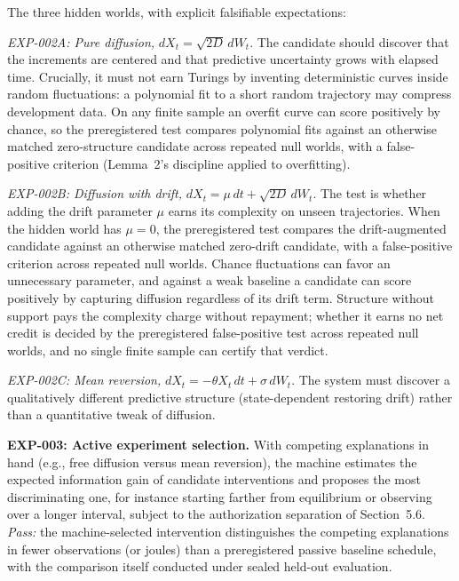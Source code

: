 \documentclass[11pt]{article}
\begin{document}
The three hidden worlds, with explicit falsifiable expectations:

\textit{EXP-002A: Pure diffusion,} \(dX_t=\sqrt{2D}\,dW_t\). The candidate should discover that the increments are centered and that predictive uncertainty grows with elapsed time. Crucially, it must not earn Turings by inventing deterministic curves inside random fluctuations: a polynomial fit to a short random trajectory may compress development data. On any finite sample an overfit curve can score positively by chance, so the preregistered test compares polynomial fits against an otherwise matched zero-structure candidate across repeated null worlds, with a false-positive criterion (Lemma~2's discipline applied to overfitting).

\textit{EXP-002B: Diffusion with drift,} \(dX_t=\mu\,dt+\sqrt{2D}\,dW_t\). The test is whether adding the drift parameter \(\mu\) earns its complexity on unseen trajectories. When the hidden world has \(\mu=0\), the preregistered test compares the drift-augmented candidate against an otherwise matched zero-drift candidate, with a false-positive criterion across repeated null worlds. Chance fluctuations can favor an unnecessary parameter, and against a weak baseline a candidate can score positively by capturing diffusion regardless of its drift term. Structure without support pays the complexity charge without repayment; whether it earns no net credit is decided by the preregistered false-positive test across repeated null worlds, and no single finite sample can certify that verdict.

\textit{EXP-002C: Mean reversion,} \(dX_t=-\theta X_t\,dt+\sigma\,dW_t\). The system must discover a qualitatively different predictive structure (state-dependent restoring drift) rather than a quantitative tweak of diffusion.

\textbf{EXP-003: Active experiment selection.} With competing explanations in hand (e.g., free diffusion versus mean reversion), the machine estimates the expected information gain of candidate interventions and proposes the most discriminating one, for instance starting farther from equilibrium or observing over a longer interval, subject to the authorization separation of Section~5.6. \textit{Pass:} the machine-selected intervention distinguishes the competing explanations in fewer observations (or joules) than a preregistered passive baseline schedule, with the comparison itself conducted under sealed held-out evaluation.
\end{document}

